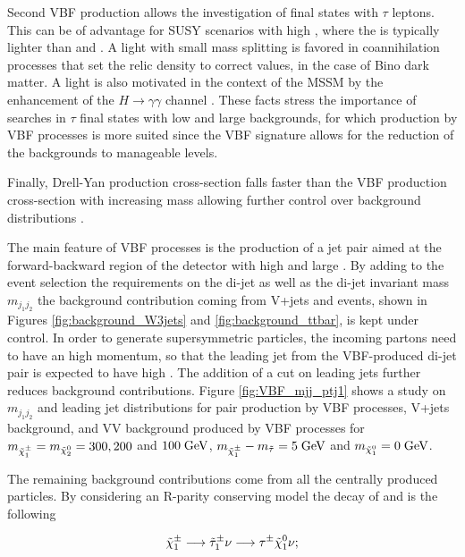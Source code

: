Second VBF production allows the investigation of final states with $\tau$ leptons. This can be of advantage for SUSY scenarios with high \tanbeta, where the \stau is typically lighter than  \smuon and \selectron  \cite{Hinchliffe:1999zc}. A light \stau with small mass splitting is favored in coannihilation processes \cite{Griest:1990kh} that set the relic density to correct values, in the case of Bino dark matter. A light \stau is also motivated in the context of the MSSM by the enhancement of the $H \longrightarrow \gamma\gamma$ channel \cite{Carena:2011aa}. These facts stress the importance of searches in $\tau$ final states with low \pt and large backgrounds, for which production by VBF processes is more suited since the VBF signature allows for the reduction of the backgrounds to manageable levels.

Finally, Drell-Yan production cross-section falls faster than the VBF production cross-section with increasing mass allowing further control over background distributions \cite{Datta:2002vy} .

The main feature of VBF processes is the production of a jet pair aimed at the forward-backward region of the detector with high \pt and large \deltaeta. By adding to the event selection the requirements on the di-jet \deltaeta as well as the di-jet invariant mass \ensuremath{m_{j_{1}j_{2}}} the background contribution coming from V+jets and \ttbar events, shown in Figures \ref{fig:background_W3jets} and \ref{fig:background_ttbar}, is kept under control. In order to generate supersymmetric particles, the incoming partons need to have an high momentum, so that the leading jet from the VBF-produced di-jet pair is expected to have high \pt. The addition of a \pt cut on leading jets further reduces background contributions. Figure \ref{fig:VBF_mjj_ptj1} shows a study on \ensuremath{m_{j_{1}j_{2}}} and leading jet \pt distributions for \charginopm \charginopm pair production by VBF processes, V+jets background, and VV background produced by VBF processes for \ensuremath{m_{\charginopm} = m_{\neutralinotwo} = 300, 200} and \ensuremath{100\gev}, \ensuremath{m_{\charginopm} - m_{\tilde{\tau}} = 5\gev} and \ensuremath{m_{\neutralinoone} = 0\gev}.

The remaining background contributions come from all the centrally produced particles. By considering an R-parity conserving model the decay of \charginopm and \neutralinotwo is the following

\begin{equation}
\tilde{\chi}^{\pm}_{1} \longrightarrow \tilde{\tau}_{1}^{\pm} \nu \longrightarrow \tau^{\pm} \tilde{\chi}^{0}_{1} \nu ;
\end{equation}

